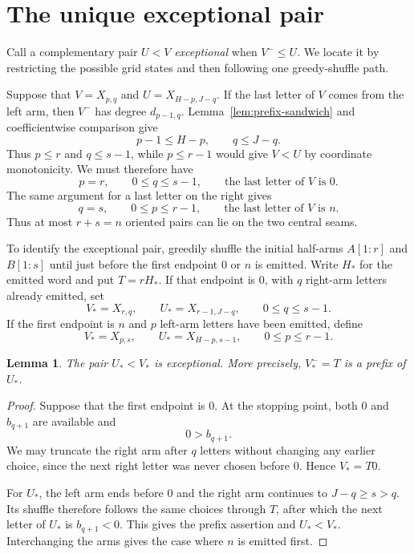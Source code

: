 \documentclass[11pt]{amsart}
\numberwithin{equation}{section}
\newtheorem{lemma}[theorem]{Lemma}
\theoremstyle{definition}
\begin{document}
\section{The unique exceptional pair}\label{sec:seam}

Call a complementary pair $U<V$ \emph{exceptional} when $V^{-}\leq U$. We locate it by restricting the possible grid states and then following one greedy-shuffle path.

Suppose that $V=X_{p,q}$ and $U=X_{H-p,J-q}$. If the last letter of $V$ comes from the left arm, then $V^{-}$ has degree $d_{p-1,q}$. Lemma~\ref{lem:prefix-sandwich} and coefficientwise comparison give
\[
 p-1\leq H-p,\qquad q\leq J-q.
\]
Thus $p\leq r$ and $q\leq s-1$, while $p\leq r-1$ would give $V<U$ by coordinate monotonicity. We must therefore have
\begin{equation}\label{eq:left-seam}
 p=r,\qquad 0\leq q\leq s-1,\qquad\text{the last letter of $V$ is }0.
\end{equation}
The same argument for a last letter on the right gives
\begin{equation}\label{eq:right-seam}
 q=s,\qquad 0\leq p\leq r-1,\qquad\text{the last letter of $V$ is }n.
\end{equation}
Thus at most $r+s=n$ oriented pairs can lie on the two central seams.

To identify the exceptional pair, greedily shuffle the initial half-arms $A[1:r]$ and $B[1:s]$ until just before the first endpoint $0$ or $n$ is emitted. Write $H_*$ for the emitted word and put $T=rH_*$. If that endpoint is $0$, with $q$ right-arm letters already emitted, set
\begin{equation}\label{eq:left-exception}
 V_*=X_{r,q},\qquad U_*=X_{r-1,J-q},\qquad 0\leq q\leq s-1.
\end{equation}
If the first endpoint is $n$ and $p$ left-arm letters have been emitted, define
\begin{equation}\label{eq:right-exception}
 V_*=X_{p,s},\qquad U_*=X_{H-p,s-1},\qquad 0\leq p\leq r-1.
\end{equation}

\begin{lemma}\label{lem:exception-exists}
The pair $U_*<V_*$ is exceptional. More precisely, $V_*^{-}=T$ is a prefix of $U_*$.
\end{lemma}
\begin{proof}
Suppose that the first endpoint is $0$. At the stopping point, both $0$ and $b_{q+1}$ are available and
\[
 0>b_{q+1}.
\]
We may truncate the right arm after $q$ letters without changing any earlier choice, since the next right letter was never chosen before $0$. Hence $V_*=T0$.

For $U_*$, the left arm ends before $0$ and the right arm continues to $J-q\geq s>q$. Its shuffle therefore follows the same choices through $T$, after which the next letter of $U_*$ is $b_{q+1}<0$. This gives the prefix assertion and $U_*<V_*$. Interchanging the arms gives the case where $n$ is emitted first.
\end{proof}
\end{document}
